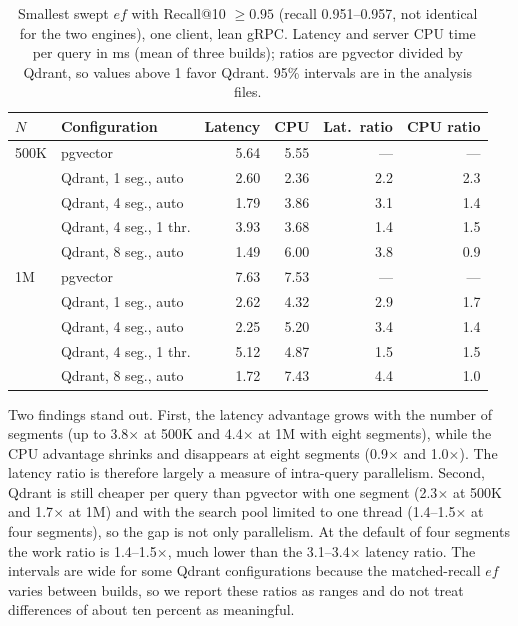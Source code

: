 \documentclass[preprint,12pt]{elsarticle}
\begin{document}
\begin{table}[t]
  \caption{Smallest swept $ef$ with Recall@10 $\ge 0.95$ (recall 0.951--0.957, not identical
  for the two engines), one client, lean gRPC. Latency and server CPU time per
  query in ms (mean of three builds); ratios are pgvector divided by Qdrant, so values
  above 1 favor Qdrant. 95\% intervals are in the analysis files.}
  \label{tab:cpu}
  \small
  \begin{tabular}{llrrrr}
    \toprule
    $N$ & Configuration & Latency & CPU & Lat.\ ratio & CPU ratio \\
    \midrule
    500K & pgvector              & 5.64 & 5.55 & --- & --- \\
         & Qdrant, 1 seg., auto  & 2.60 & 2.36 & 2.2 & 2.3 \\
         & Qdrant, 4 seg., auto  & 1.79 & 3.86 & 3.1 & 1.4 \\
         & Qdrant, 4 seg., 1 thr.& 3.93 & 3.68 & 1.4 & 1.5 \\
         & Qdrant, 8 seg., auto  & 1.49 & 6.00 & 3.8 & 0.9 \\
    \midrule
    1M   & pgvector              & 7.63 & 7.53 & --- & --- \\
         & Qdrant, 1 seg., auto  & 2.62 & 4.32 & 2.9 & 1.7 \\
         & Qdrant, 4 seg., auto  & 2.25 & 5.20 & 3.4 & 1.4 \\
         & Qdrant, 4 seg., 1 thr.& 5.12 & 4.87 & 1.5 & 1.5 \\
         & Qdrant, 8 seg., auto  & 1.72 & 7.43 & 4.4 & 1.0 \\
    \bottomrule
  \end{tabular}
\end{table}

Two findings stand out. First, the latency advantage grows with the number of segments
(up to 3.8$\times$ at 500K and 4.4$\times$ at 1M with eight segments), while the CPU
advantage shrinks and disappears at eight segments (0.9$\times$ and 1.0$\times$). The
latency ratio is therefore largely a measure of intra-query parallelism. Second, Qdrant
is still cheaper per query than pgvector with one segment (2.3$\times$ at 500K and
1.7$\times$ at 1M) and with the search pool limited to one thread (1.4--1.5$\times$ at
four segments), so the gap is not only parallelism. At the default of four segments the
work ratio is 1.4--1.5$\times$, much lower than the 3.1--3.4$\times$ latency ratio. The
intervals are wide for some Qdrant configurations because the matched-recall $ef$ varies
between builds, so we report these ratios as ranges and do not treat differences of
about ten percent as meaningful.
\end{document}
